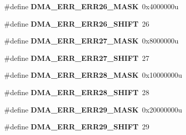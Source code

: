 \begin{DoxyCompactItemize}
\item 
\hypertarget{group___d_m_a___register___masks_gaa09e165a2a35320e042424492a0fcd1c}{}\#define {\bfseries D\+M\+A\+\_\+\+E\+R\+R\+\_\+\+E\+R\+R26\+\_\+\+M\+A\+S\+K}~0x4000000u\label{group___d_m_a___register___masks_gaa09e165a2a35320e042424492a0fcd1c}

\item 
\hypertarget{group___d_m_a___register___masks_ga4c85c4482375181e8678b86ba3746cac}{}\#define {\bfseries D\+M\+A\+\_\+\+E\+R\+R\+\_\+\+E\+R\+R26\+\_\+\+S\+H\+I\+F\+T}~26\label{group___d_m_a___register___masks_ga4c85c4482375181e8678b86ba3746cac}

\item 
\hypertarget{group___d_m_a___register___masks_ga2c9bb3f2389411da2550c3760427c507}{}\#define {\bfseries D\+M\+A\+\_\+\+E\+R\+R\+\_\+\+E\+R\+R27\+\_\+\+M\+A\+S\+K}~0x8000000u\label{group___d_m_a___register___masks_ga2c9bb3f2389411da2550c3760427c507}

\item 
\hypertarget{group___d_m_a___register___masks_ga392e9132cb5ba6f55e025d15bd593dd8}{}\#define {\bfseries D\+M\+A\+\_\+\+E\+R\+R\+\_\+\+E\+R\+R27\+\_\+\+S\+H\+I\+F\+T}~27\label{group___d_m_a___register___masks_ga392e9132cb5ba6f55e025d15bd593dd8}

\item 
\hypertarget{group___d_m_a___register___masks_ga7f28941f1b8c214737d02f0ed45a615e}{}\#define {\bfseries D\+M\+A\+\_\+\+E\+R\+R\+\_\+\+E\+R\+R28\+\_\+\+M\+A\+S\+K}~0x10000000u\label{group___d_m_a___register___masks_ga7f28941f1b8c214737d02f0ed45a615e}

\item 
\hypertarget{group___d_m_a___register___masks_gac28ff5e1c02fcfe7773e20094e6e376d}{}\#define {\bfseries D\+M\+A\+\_\+\+E\+R\+R\+\_\+\+E\+R\+R28\+\_\+\+S\+H\+I\+F\+T}~28\label{group___d_m_a___register___masks_gac28ff5e1c02fcfe7773e20094e6e376d}

\item 
\hypertarget{group___d_m_a___register___masks_gaf4843ceb432822b25679556ce182f1c9}{}\#define {\bfseries D\+M\+A\+\_\+\+E\+R\+R\+\_\+\+E\+R\+R29\+\_\+\+M\+A\+S\+K}~0x20000000u\label{group___d_m_a___register___masks_gaf4843ceb432822b25679556ce182f1c9}

\item 
\hypertarget{group___d_m_a___register___masks_ga2d49e17b63fada690d79cb548fae04de}{}\#define {\bfseries D\+M\+A\+\_\+\+E\+R\+R\+\_\+\+E\+R\+R29\+\_\+\+S\+H\+I\+F\+T}~29\label{group___d_m_a___register___masks_ga2d49e17b63fada690d79cb548fae04de}


\end{DoxyCompactItemize}
